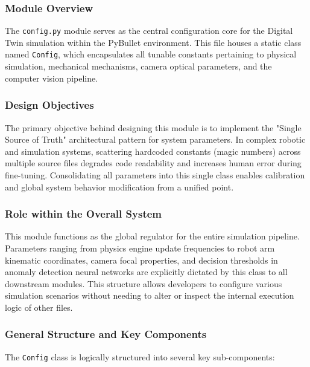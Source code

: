 \documentclass{article}
\begin{document}
\subsubsection{Module Overview}
The \texttt{config.py} module serves as the central configuration core for the Digital Twin simulation within the PyBullet environment. This file houses a static class named \texttt{Config}, which encapsulates all tunable constants pertaining to physical simulation, mechanical mechanisms, camera optical parameters, and the computer vision pipeline.

\subsubsection{Design Objectives}
The primary objective behind designing this module is to implement the "Single Source of Truth" architectural pattern for system parameters. In complex robotic and simulation systems, scattering hardcoded constants (magic numbers) across multiple source files degrades code readability and increases human error during fine-tuning. Consolidating all parameters into this single class enables calibration and global system behavior modification from a unified point.

\subsubsection{Role within the Overall System}
This module functions as the global regulator for the entire simulation pipeline. Parameters ranging from physics engine update frequencies to robot arm kinematic coordinates, camera focal properties, and decision thresholds in anomaly detection neural networks are explicitly dictated by this class to all downstream modules. This structure allows developers to configure various simulation scenarios without needing to alter or inspect the internal execution logic of other files.

\subsubsection{General Structure and Key Components}
The \texttt{Config} class is logically structured into several key sub-components:
\end{document}

